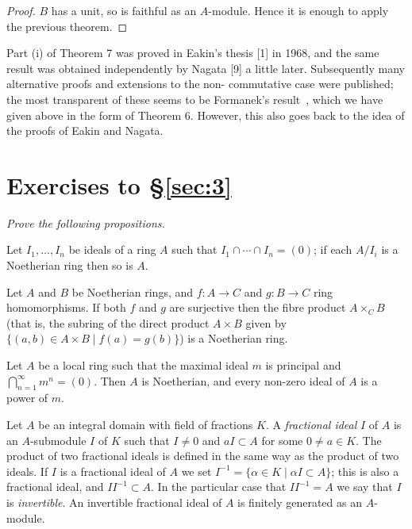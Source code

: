 \begin{proof}
$B$ has a unit, so is faithful as an $A$-module. Hence it is enough to
apply the previous theorem.
\end{proof}

\begin{remark}
Part (i) of Theorem 7 was proved in Eakin's thesis [1] in 1968,
and the same result was obtained independently by Nagata [9] a little
later. Subsequently many alternative proofs and extensions to the non-
commutative case were published; the most transparent of these seems to
be Formanek's result~\cite{Fo1}, which we have given above in the form of
Theorem 6. However, this also goes back to the idea of the proofs of
Eakin and Nagata.
\end{remark}

\section*{Exercises to \S\ref{sec:3}}
\emph{Prove the following propositions.}

\begin{exercise}\label{ex:3.1-ex}
Let $I_1, \ldots, I_n$ be ideals of a ring $A$ such that $I_1 \cap \cdots \cap I_n = (0)$; if each $A/I_i$ is a
Noetherian ring then so is $A$.
\end{exercise}

\begin{exercise}\label{ex:3.2-ex}
Let $A$ and $B$ be Noetherian rings, and $f\colon A \to C$ and $g\colon B \to C$ ring
homomorphisms. If both $f$ and $g$ are surjective then the fibre product
$A \times_C B$ (that is, the subring of the direct product $A \times B$ given by
$\{(a, b) \in A \times B \mid f(a) = g(b)\}$) is a Noetherian ring.
\end{exercise}

\begin{exercise}\label{ex:3.3-ex}
Let $A$ be a local ring such that the maximal ideal $m$ is principal and
$\bigcap_{n=1}^{\infty} m^n = (0)$. Then $A$ is Noetherian, and every non-zero ideal of $A$ is a
power of $m$.
\end{exercise}

\begin{exercise}\label{ex:3.4-ex}
Let $A$ be an integral domain with field of fractions $K$. A \emph{fractional ideal} $I$ of
$A$ is an $A$-submodule $I$ of $K$ such that $I \neq 0$ and $aI \subset A$ for some $0 \neq a \in K$.
The product of two fractional ideals is defined in the same way as the
product of two ideals. If $I$ is a fractional ideal of $A$ we set $I^{-1} = \{\alpha \in K \mid \alpha I
\subset A\}$; this is also a fractional ideal, and $II^{-1} \subset A$. In the particular case
that $II^{-1} = A$ we say that $I$ is \emph{invertible}. An invertible fractional ideal of $A$
is finitely generated as an $A$-module.
\end{exercise}

